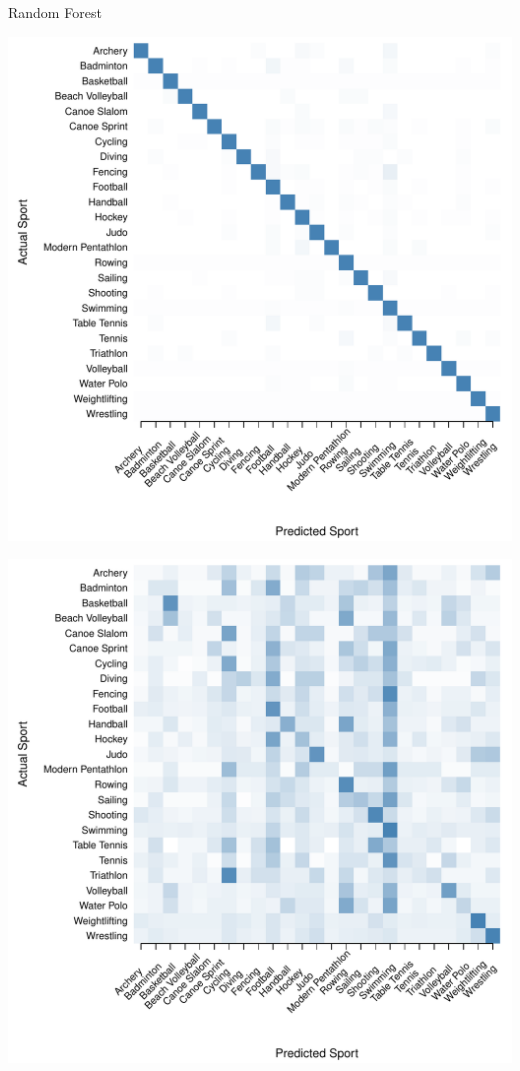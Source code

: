 \documentclass[landscape, paperwidth=42in, paperheight=36in,
fontscale=.35, margin=1in]{baposter}
\begin{document}
\begin{poster}
{\begin{center}
  Random Forest \\
  \begin{minipage}{0.45\textwidth}
    \begin{center}
      \includegraphics[scale=0.27]{../graphics/sportRF-trn.pdf}
    \end{center}
  \end{minipage}
  \hspace{0.05\textwidth}
  \begin{minipage}{0.45\textwidth}
    \begin{center}
      \includegraphics[scale=0.27]{../graphics/sportRF-tst.pdf}
    \end{center}
  \end{minipage}



\end{center}}
\end{poster}
\end{document}

